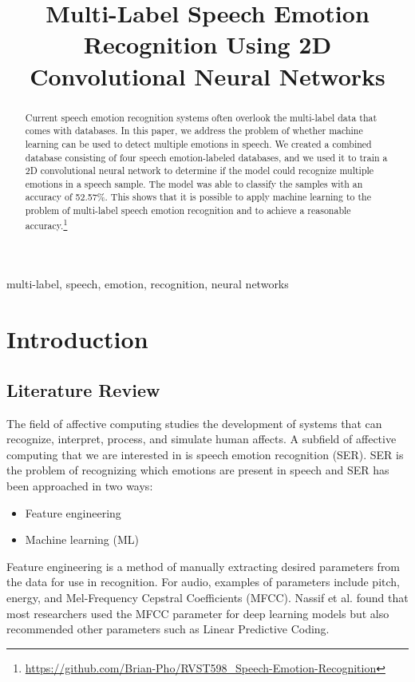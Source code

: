 \documentclass[conference]{IEEEtran}
\begin{document}
\title{Multi-Label Speech Emotion Recognition Using 2D Convolutional Neural Networks}

\author{
}

\maketitle

\begin{abstract}
Current speech emotion recognition systems often overlook the multi-label data that comes with databases. In this paper, we address the problem of whether machine learning can be used to detect multiple emotions in speech. We created a combined database consisting of four speech emotion-labeled databases, and we used it to train a 2D convolutional neural network to determine if the model could recognize multiple emotions in a speech sample. The model was able to classify the samples with an accuracy of 52.57\%. This shows that it is possible to apply machine learning to the problem of multi-label speech emotion recognition and to achieve a reasonable accuracy.\footnote{\url{https://github.com/Brian-Pho/RVST598_Speech-Emotion-Recognition}}
\end{abstract}

\begin{IEEEkeywords}
multi-label, speech, emotion, recognition, neural networks
\end{IEEEkeywords}

\section{Introduction}

\subsection{Literature Review}

The field of affective computing studies the development of systems that can recognize, interpret, process, and simulate human affects. A subfield of affective computing that we are interested in is speech emotion recognition (SER). SER is the problem of recognizing which emotions are present in speech and SER has been approached in two ways:
\begin{itemize}
	\item Feature engineering
	\item Machine learning (ML)
\end{itemize} 
Feature engineering is a method of manually extracting desired parameters from the data for use in  recognition. For audio, examples of parameters include pitch, energy, and Mel-Frequency Cepstral Coefficients (MFCC).\cite{Rybka2013} Nassif et al. \cite{Nassif2019} found that most researchers used the MFCC parameter for deep learning models but also recommended other parameters such as Linear Predictive Coding. 
\end{document}
